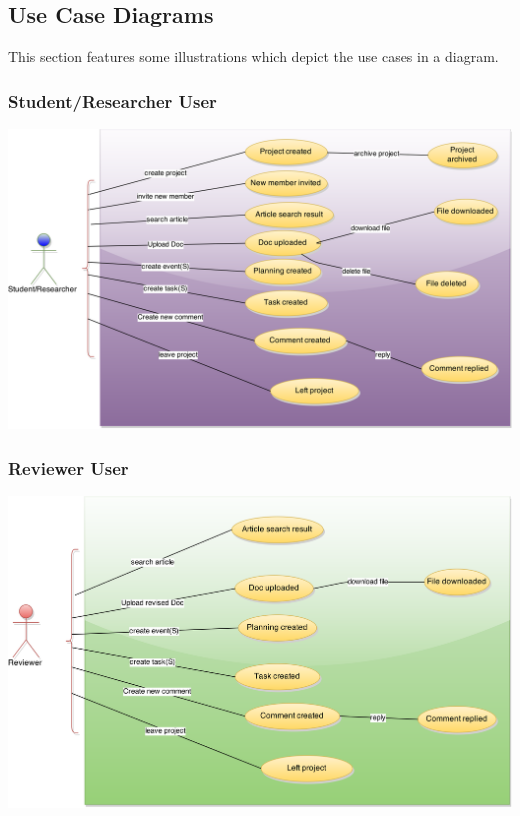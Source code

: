 \newpage

\subsection{Use Case Diagrams} %
This section features some illustrations which depict the use cases in a diagram.
\subsubsection{Student/Researcher User} 

\begin{center}
\centering
\includegraphics[scale=0.3]{./img/dsgn_img/USECASE1.png}	
\end{center}


\subsubsection{Reviewer User} 
\begin{center}
\includegraphics[scale=0.3]{./img/dsgn_img/USECASE2.png}
	
\end{center}

